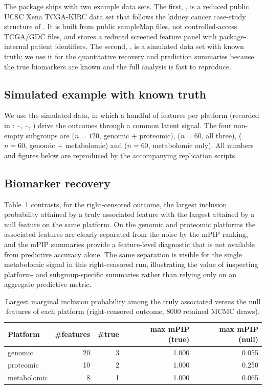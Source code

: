 \documentclass[article]{jss}
\begin{document}
The package ships with two example data sets.  The first, , is a
reduced public UCSC Xena TCGA-KIRC data set that follows the kidney cancer
case-study structure of \citet{chekouo2017}.  It is built from public sampleMap
files, not controlled-access TCGA/GDC files, and stores a reduced screened
feature panel with package-internal patient identifiers.  The second,
, is a simulated data set with known truth; we use it for the
quantitative recovery and prediction summaries because the true biomarkers are
known and the full analysis is fast to reproduce.

\subsection{Simulated example with known truth}\label{sec:sim-illustration}

We use the simulated  data, in which a handful of features per
platform (recorded in : --,
--, ) drive the outcomes through a common latent
signal. The four non-empty subgroups are  ($n=120$, genomic +
proteomic),  ($n=60$, all three),  ($n=60$, genomic +
metabolomic) and  ($n=60$, metabolomic only). All numbers and figures
below are reproduced by the accompanying replication scripts.

\subsection{Biomarker recovery}\label{sec:recovery}

Table~\ref{tab:recovery} contrasts, for the right-censored outcome, the largest
inclusion probability attained by a truly associated feature with the largest
attained by a null feature on the same platform. On the genomic and proteomic
platforms the associated features are clearly separated from the noise by the
mPIP ranking, and the mPIP summaries
provide a feature-level diagnostic that is not available from predictive
accuracy alone.  The same separation is visible for the single metabolomic
signal in this right-censored run, illustrating the value of inspecting
platform- and subgroup-specific summaries rather than relying only on an
aggregate predictive metric.

\begin{table}[H]
\centering
\begin{tabular}{l r r r r}
\hline
Platform & \#features & \#true & max mPIP (true) & max mPIP (null) \\
\hline
genomic     & 20 & 3 & 1.000 & 0.055 \\
proteomic   & 10 & 2 & 1.000 & 0.250 \\
metabolomic &  8 & 1 & 1.000 & 0.065 \\
\hline
\end{tabular}
\caption{\label{tab:recovery}Largest marginal inclusion probability among the
truly associated versus the null features of each platform (right-censored
outcome, 8000 retained MCMC draws).}
\end{table}
\end{document}
